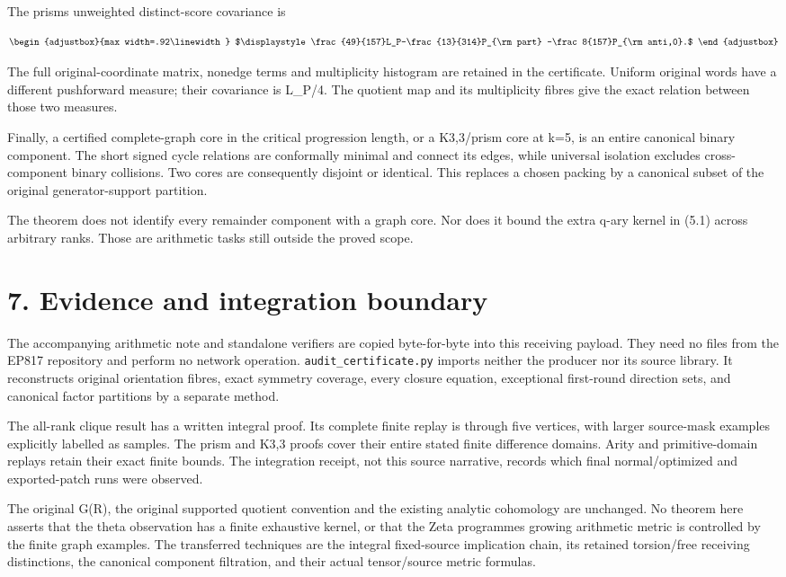 The prism\textquotesingle s unweighted distinct-score covariance is

\[
\begin{adjustbox}{max width=.92\linewidth}
$\displaystyle \frac{49}{157}L_P-\frac{13}{314}P_{\rm part}
-\frac8{157}P_{\rm anti,0}.$
\end{adjustbox}
\]

The full original-coordinate matrix, nonedge terms and multiplicity histogram are retained in the certificate. Uniform original words have a different pushforward measure; their covariance is L\_P/4. The quotient map and its multiplicity fibres give the exact relation between those two measures.

Finally, a certified complete-graph core in the critical progression length, or a K3,3/prism core at k=5, is an entire canonical binary component. The short signed cycle relations are conformally minimal and connect its edges, while universal isolation excludes cross-component binary collisions. Two cores are consequently disjoint or identical. This replaces a chosen packing by a canonical subset of the original generator-support partition.

The theorem does not identify every remainder component with a graph core. Nor does it bound the extra q-ary kernel in (5.1) across arbitrary ranks. Those are arithmetic tasks still outside the proved scope.

\section{7. Evidence and integration boundary}\label{n19-evidence-and-integration-boundary}

The accompanying arithmetic note and standalone verifiers are copied byte-for-byte into this receiving payload. They need no files from the EP817 repository and perform no network operation. \texttt{audit\_certificate.py} imports neither the producer nor its source library. It reconstructs original orientation fibres, exact symmetry coverage, every closure equation, exceptional first-round direction sets, and canonical factor partitions by a separate method.

The all-rank clique result has a written integral proof. Its complete finite replay is through five vertices, with larger source-mask examples explicitly labelled as samples. The prism and K3,3 proofs cover their entire stated finite difference domains. Arity and primitive-domain replays retain their exact finite bounds. The integration receipt, not this source narrative, records which final normal/optimized and exported-patch runs were observed.

The original G(R), the original supported quotient convention and the existing analytic cohomology are unchanged. No theorem here asserts that the theta observation has a finite exhaustive kernel, or that the Zeta programme\textquotesingle s growing arithmetic metric is controlled by the finite graph examples. The transferred techniques are the integral fixed-source implication chain, its retained torsion/free receiving distinctions, the canonical component filtration, and their actual tensor/source metric formulas.

